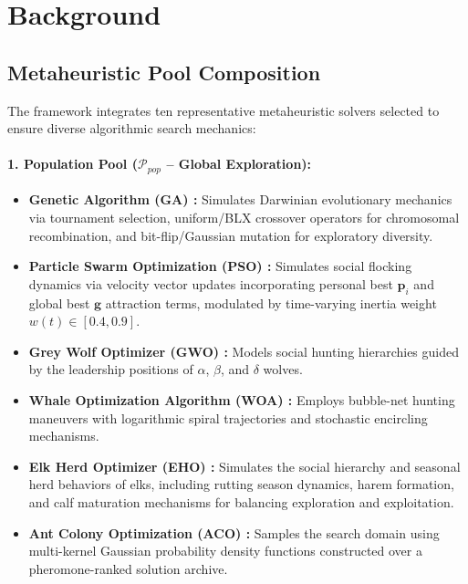 \documentclass[review]{elsarticle}
\begin{document}
\section{Background}
\label{sec:background}

\subsection{Metaheuristic Pool Composition}
\label{sec:metaheuristic_pools}

The framework integrates ten representative metaheuristic solvers selected to ensure diverse algorithmic search mechanics:

\paragraph{1. Population Pool ($\mathcal{P}_{pop}$ -- Global Exploration):}
\begin{itemize}
    \item \textbf{Genetic Algorithm (GA) \cite{chu1998genetic}:} Simulates Darwinian evolutionary mechanics via tournament selection, uniform/BLX crossover operators for chromosomal recombination, and bit-flip/Gaussian mutation for exploratory diversity.
    \item \textbf{Particle Swarm Optimization (PSO) \cite{kennedy1995particle}:} Simulates social flocking dynamics via velocity vector updates incorporating personal best $\mathbf{p}_i$ and global best $\mathbf{g}$ attraction terms, modulated by time-varying inertia weight $w(t) \in [0.4, 0.9]$.
    \item \textbf{Grey Wolf Optimizer (GWO) \cite{mirjalili2014grey}:} Models social hunting hierarchies guided by the leadership positions of $\alpha$, $\beta$, and $\delta$ wolves.
    \item \textbf{Whale Optimization Algorithm (WOA) \cite{mirjalili2016whale}:} Employs bubble-net hunting maneuvers with logarithmic spiral trajectories and stochastic encircling mechanisms.
    \item \textbf{Elk Herd Optimizer (EHO) \cite{albetar2024elk}:} Simulates the social hierarchy and seasonal herd behaviors of elks, including rutting season dynamics, harem formation, and calf maturation mechanisms for balancing exploration and exploitation.
    \item \textbf{Ant Colony Optimization (ACO) \cite{dorigo2004ant}:} Samples the search domain using multi-kernel Gaussian probability density functions constructed over a pheromone-ranked solution archive.
\end{itemize}
\end{document}
